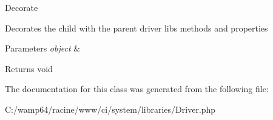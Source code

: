 Decorate

Decorates the child with the parent driver lib\textquotesingle{}s methods and properties


\begin{DoxyParams}{Parameters}
{\em object} & \\
\hline
\end{DoxyParams}
\begin{DoxyReturn}{Returns}
void 
\end{DoxyReturn}


The documentation for this class was generated from the following file\+:\begin{DoxyCompactItemize}
\item 
C\+:/wamp64/racine/www/ci/system/libraries/Driver.\+php\end{DoxyCompactItemize}
